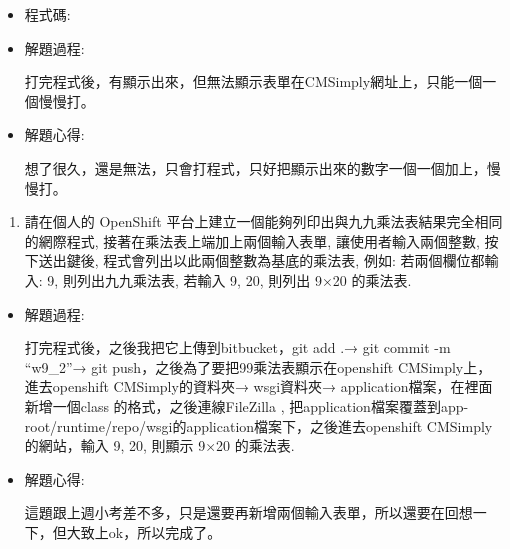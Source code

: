 \documentclass[]{article}
\newenvironment{Shaded}{}{}
\newcommand{\KeywordTok}[1]{\textcolor[rgb]{0.00,0.44,0.13}{\textbf{{#1}}}}
\newcommand{\DataTypeTok}[1]{\textcolor[rgb]{0.56,0.13,0.00}{{#1}}}
\newcommand{\DecValTok}[1]{\textcolor[rgb]{0.25,0.63,0.44}{{#1}}}
\newcommand{\CharTok}[1]{\textcolor[rgb]{0.25,0.44,0.63}{{#1}}}
\newcommand{\StringTok}[1]{\textcolor[rgb]{0.25,0.44,0.63}{{#1}}}
\newcommand{\OtherTok}[1]{\textcolor[rgb]{0.00,0.44,0.13}{{#1}}}
\newcommand{\NormalTok}[1]{{#1}}
\begin{document}
\begin{itemize}
\item
  程式碼:

\begin{Shaded}
\end{Shaded}
\item
  解題過程:

  打完程式後，有顯示出來，但無法顯示表單在CMSimply網址上，只能一個一個慢慢打。
\item
  解題心得:

  想了很久，還是無法，只會打程式，只好把顯示出來的數字一個一個加上，慢慢打。
\end{itemize}

\begin{enumerate}
\def\labelenumi{\arabic{enumi}.}
\setcounter{enumi}{1}
\itemsep1pt\parskip0pt
\item
  請在個人的 OpenShift
  平台上建立一個能夠列印出與九九乘法表結果完全相同的網際程式,
  接著在乘法表上端加上兩個輸入表單, 讓使用者輸入兩個整數, 按下送出鍵後,
  程式會列出以此兩個整數為基底的乘法表, 例如: 若兩個欄位都輸入: 9,
  則列出九九乘法表, 若輸入 9, 20, 則列出 9×20 的乘法表.
\end{enumerate}

\begin{itemize}
\item
  解題過程:

  打完程式後，之後我把它上傳到bitbucket，git add .→ git commit -m
  ``w9\_2''→ git push，之後為了要把99乘法表顯示在openshift
  CMSimply上，進去openshift CMSimply的資料夾→ wsgi資料夾→
  application檔案，在裡面新增一個class 的格式，之後連線FileZilla ,
  把application檔案覆蓋到app-root/runtime/repo/wsgi的application檔案下，之後進去openshift
  CMSimply的網站，輸入 9, 20, 則顯示 9×20 的乘法表.
\item
  解題心得:

  這題跟上週小考差不多，只是還要再新增兩個輸入表單，所以還要在回想一下，但大致上ok，所以完成了。
\end{itemize}
\end{document}
